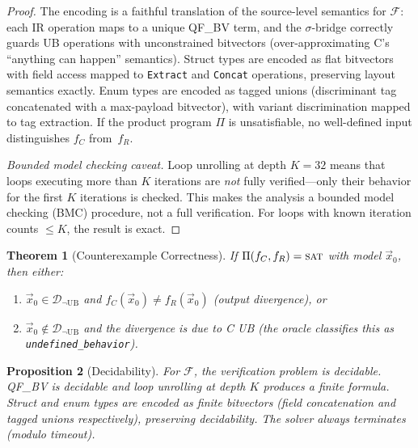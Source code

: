 \documentclass[11pt]{article}
\newtheorem{theorem}{Theorem}
\newtheorem{proposition}[theorem]{Proposition}
\newcommand{\sigbridge}{$\sigma$-bridge}
\newcommand{\qfbv}{\textsf{QF\_BV}}
\newcommand{\SAT}{\textsc{sat}}
\begin{document}
\begin{proof}
The encoding is a faithful translation of the source-level semantics for
$\mathcal{F}$: each IR operation maps to a unique \qfbv{} term, and the
\sigbridge{} correctly guards UB operations with unconstrained bitvectors
(over-approximating C's ``anything can happen'' semantics).  Struct types
are encoded as flat bitvectors with field access mapped to \texttt{Extract}
and \texttt{Concat} operations, preserving layout semantics exactly.
Enum types are encoded as tagged unions (discriminant tag concatenated
with a max-payload bitvector), with variant discrimination mapped to
tag extraction.  If the product program $\Pi$ is unsatisfiable, no
well-defined input distinguishes $f_C$ from~$f_R$.

\medskip\noindent\emph{Bounded model checking caveat.}
Loop unrolling at depth $K=32$ means that loops executing more than
$K$ iterations are \emph{not} fully verified---only their behavior
for the first $K$ iterations is checked.  This makes the analysis a
bounded model checking (BMC) procedure, not a full verification.
For loops with known iteration counts $\leq K$, the result is exact.
\end{proof}

\begin{theorem}[Counterexample Correctness]\label{thm:cex}
If $\Pi(f_C, f_R) = \SAT{}$ with model $\vec{x}_0$, then either:
\begin{enumerate}[nosep]
\item $\vec{x}_0 \in \mathcal{D}_{\neg\mathrm{UB}}$ and
      $f_C(\vec{x}_0) \neq f_R(\vec{x}_0)$ (output divergence), or
\item $\vec{x}_0 \notin \mathcal{D}_{\neg\mathrm{UB}}$ and the divergence
      is due to C UB (the oracle classifies this as
      \texttt{undefined\_behavior}).
\end{enumerate}
\end{theorem}

\begin{proposition}[Decidability]\label{prop:decide}
For $\mathcal{F}$, the verification problem is decidable.  \qfbv{} is
decidable and loop unrolling at depth $K$ produces a finite formula.
Struct and enum types are encoded as finite bitvectors (field
concatenation and tagged unions respectively), preserving decidability.
The solver always terminates (modulo timeout).
\end{proposition}
\end{document}
